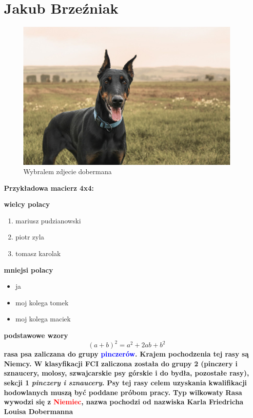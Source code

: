 \section{Jakub Brzeźniak}
\label{sec:jbrzezniak}

\begin{figure}
    \centering
    \includegraphics{pictures/doberman.jpg}
    \caption{Wybralem zdjecie dobermana}
\end{figure}



\textbf{Przykładowa macierz 4x4:}




\textbf{wielcy polacy}
\begin{enumerate}
    \item mariusz pudzianowski
    \item piotr zyla
    \item tomasz karolak
\end{enumerate}

\textbf{mniejsi polacy}
\begin{itemize}
    \item ja
    \item moj kolega tomek
    \item moj kolega maciek
\end{itemize}



\textbf{podstawowe wzory}
\[(a+b)^2=a^2+2ab+b^2\]
\newpage
\textbf{rasa psa zaliczana do grupy \textcolor{blue}{pinczerów}. Krajem pochodzenia tej rasy są Niemcy. W klasyfikacji FCI zaliczona została do grupy 2 (pinczery i sznaucery, molosy, szwajcarskie psy górskie i do bydła, pozostałe rasy), sekcji 1 \textit{pinczery i sznaucery}. Psy tej rasy celem uzyskania kwalifikacji hodowlanych muszą być poddane próbom pracy. Typ wilkowaty}
\textbf{Rasa wywodzi się z \textcolor{red}{Niemiec}, nazwa pochodzi od nazwiska Karla Friedricha Louisa Dobermanna}
